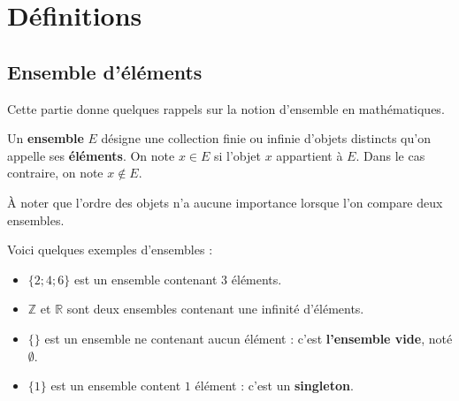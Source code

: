 


	
	
	
	
	\section{Définitions}
	
	\subsection{Ensemble d'éléments}
	
	Cette partie donne quelques rappels sur la notion d'ensemble en mathématiques.
	
	\begin{formula}[Définition]
		Un \textbf{ensemble} $E$ désigne une collection finie ou infinie d'objets distincts qu'on appelle ses \textbf{éléments}.
		\newpar
		On note $x \in E$ si l'objet $x$ appartient à $E$. Dans le cas contraire, on note $x \notin E$.
	\end{formula}
	
	À noter que l'ordre des objets n'a aucune importance lorsque l'on compare deux ensembles.
	
	\begin{tip}[Exemple]
		Voici quelques exemples d'ensembles :
		\begin{itemize}
			\item $\{2; 4; 6\}$ est un ensemble contenant $3$ éléments.
			\item $\mathbb{Z}$ et $\mathbb{R}$ sont deux ensembles contenant une infinité d'éléments.
			\item $\{\}$ est un ensemble ne contenant aucun élément : c'est \textbf{l'ensemble vide}, noté $\emptyset$.
			\item $\{1\}$ est un ensemble content $1$ élément : c'est un \textbf{singleton}.
		\end{itemize}
	\end{tip}
	
